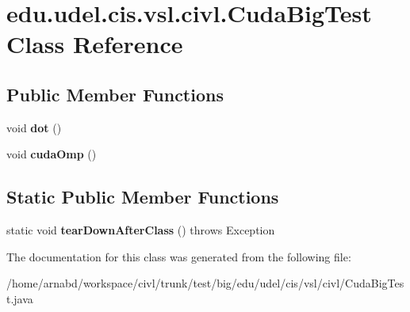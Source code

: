 \hypertarget{classedu_1_1udel_1_1cis_1_1vsl_1_1civl_1_1CudaBigTest}{}\section{edu.\+udel.\+cis.\+vsl.\+civl.\+Cuda\+Big\+Test Class Reference}
\label{classedu_1_1udel_1_1cis_1_1vsl_1_1civl_1_1CudaBigTest}
\subsection*{Public Member Functions}
\begin{DoxyCompactItemize}
\item 
\hypertarget{classedu_1_1udel_1_1cis_1_1vsl_1_1civl_1_1CudaBigTest_a58d0fec77db3f62869aafef0a72e1a3c}{}void {\bfseries dot} ()\label{classedu_1_1udel_1_1cis_1_1vsl_1_1civl_1_1CudaBigTest_a58d0fec77db3f62869aafef0a72e1a3c}

\item 
\hypertarget{classedu_1_1udel_1_1cis_1_1vsl_1_1civl_1_1CudaBigTest_adbf1923a7b85b6963ece69e06a1bec6a}{}void {\bfseries cuda\+Omp} ()\label{classedu_1_1udel_1_1cis_1_1vsl_1_1civl_1_1CudaBigTest_adbf1923a7b85b6963ece69e06a1bec6a}

\end{DoxyCompactItemize}
\subsection*{Static Public Member Functions}
\begin{DoxyCompactItemize}
\item 
\hypertarget{classedu_1_1udel_1_1cis_1_1vsl_1_1civl_1_1CudaBigTest_a8b6ed117a11a3a4ad84d1673a75103ce}{}static void {\bfseries tear\+Down\+After\+Class} ()  throws Exception \label{classedu_1_1udel_1_1cis_1_1vsl_1_1civl_1_1CudaBigTest_a8b6ed117a11a3a4ad84d1673a75103ce}

\end{DoxyCompactItemize}


The documentation for this class was generated from the following file\+:\begin{DoxyCompactItemize}
\item 
/home/arnabd/workspace/civl/trunk/test/big/edu/udel/cis/vsl/civl/Cuda\+Big\+Test.\+java\end{DoxyCompactItemize}
